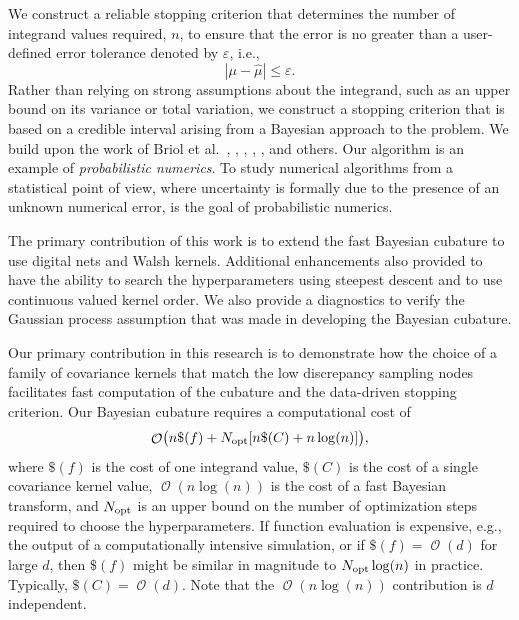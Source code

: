 \documentclass{svjour3}                     %
\DeclareMathOperator{\Order}{{\mathcal O}}
\newcommand{\opt}{{\textup{opt}}}
\newcommand{\hmu}{\widehat{\mu}}
\newcommand{\errtol}{\varepsilon}
\def\abs#1{\ensuremath{\left \lvert #1 \right \rvert}}
\begin{document}
We construct a reliable stopping criterion that determines the number of integrand values required, $n$, to ensure that the error is no greater than a user-defined error tolerance denoted by $\varepsilon$, i.e., 
\begin{equation}
\label{eqn:err_crit} 
\abs{\mu - \hmu} \leq \errtol .
\end{equation}
Rather than relying on strong assumptions about the integrand, such as an upper bound on its variance or total variation, we construct a stopping criterion that is based on a credible interval arising from a Bayesian approach to the problem.  We build upon the work of Briol et al.~\cite{BriEtal18a}, \cite{Dia88a}, \cite{OHa91a}, \cite{Rit00a}, \cite{RasGha03a}, and others.  Our algorithm is an example of \emph{probabilistic numerics}.
To study numerical algorithms from a statistical point of view, where uncertainty is formally due to the presence of an unknown numerical error, is the goal of probabilistic numerics.


The primary contribution of this work is to extend the fast Bayesian cubature \cite{JagHic19a} to use digital nets and Walsh kernels. Additional enhancements also provided to have the ability to search the hyperparameters using steepest descent and to use continuous valued kernel order.
We also provide a diagnostics to verify the Gaussian process assumption that was made in developing the Bayesian cubature.


\iffalse
Our primary contribution in this research is to demonstrate how the choice of a family of covariance kernels that match the low discrepancy sampling nodes facilitates fast computation of the cubature and the data-driven stopping criterion.  Our Bayesian cubature requires a computational cost of
\begin{equation} \label{eqn:OuralgoCost}
\Order\bigl(n \$(f) + N_{\opt}[n\$(C) + 
n \log(n)] \bigr),
\end{equation} 
where $\$(f)$ is the cost of one integrand value, $\$(C)$ is the cost of a single covariance kernel value,  $\Order(n \log(n))$ is the cost of a fast Bayesian transform, and $N_{\opt}$ is an upper bound on the number of optimization steps required to choose the hyperparameters. If function evaluation is expensive, e.g., the output of a computationally intensive simulation, or if $\$(f) = \Order(d)$ for large $d$, then $\$(f)$ might be similar in magnitude to $N_{\opt} \log(n)$ in practice.  Typically, $\$(C) = \Order(d)$.  Note that the $\Order(n \log(n))$ contribution is $d$ independent.
\end{document}
